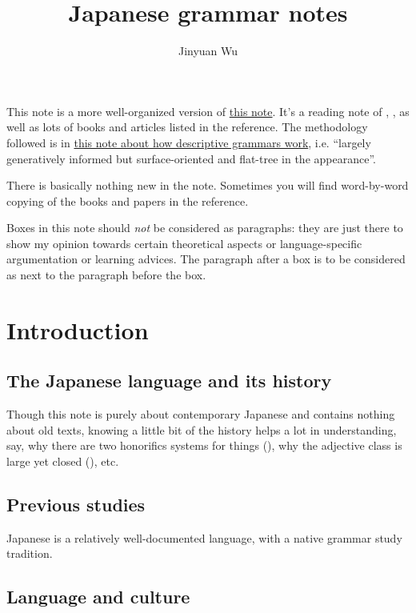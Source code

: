 \documentclass[UTF8, a4paper, oneside, scheme=plain]{ctexrep}
\title{Japanese grammar notes}
\author{Jinyuan Wu}
\newcommand{\method}{\href{../methodology/glossing.pdf}{this note about how descriptive grammars work}}
\begin{document}
\maketitle

\automath

This note is a more well-organized version of \href{./japanese-note-1.pdf}{this note}.
It's a reading note of \citet{akiyama2012japanese}, \citet{tsutsui1989dictionary},
as well as lots of books and articles listed in the reference.
The methodology followed is in \method,
i.e. ``largely generatively informed but surface-oriented and flat-tree in the appearance''.

There is basically nothing new in the note. 
Sometimes you will find word-by-word copying of the books and papers in the reference.

Boxes in this note should \emph{not} be considered as paragraphs:
they are just there to show my opinion towards certain theoretical aspects 
or language-specific argumentation
or learning advices.
The paragraph after a box is to be considered as next to the paragraph before the box.

\chapter{Introduction}

\section{The Japanese language and its history}

Though this note is purely about contemporary Japanese and contains nothing about old texts,
knowing a little bit of the history helps a lot in understanding, say,
why there are two honorifics systems for things (),
why the adjective class is large yet closed (), etc.

\section{Previous studies}

Japanese is a relatively well-documented language,
with a native grammar study tradition.

\section{Language and culture}
\end{document}

